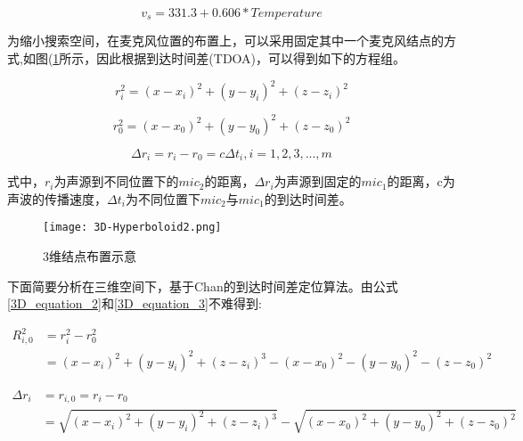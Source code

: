 \documentclass[winfonts]{njuthesis}
\begin{document}
		\begin{equation}
		   v_s = 331.3 + 0.606 * Temperature \label{v_speed}
		\end{equation}
		
		为缩小搜索空间，在麦克风位置的布置上，可以采用固定其中一个麦克风结点的方式,如图(\ref{fig: 3D-Hyperboloid2}所示，因此根据到达时间差(TDOA)，可以得到如下的方程组。
		
		\begin{equation}
			 r_i^2 = (x-x_i)^2 + (y-y_i)^2 + (z-z_i)^2 \label{3D_equation_2}
		\end{equation}
		
		\begin{equation}
			r_0^2 = (x-x_0)^2 + (y-y_0)^2 + (z-z_0)^2 \label{3D_equation_3}
		\end{equation}
		
		\begin{equation}
			\Delta r_i = r_i - r_0 = c\Delta t_i, i = 1,2,3,...,m \label{3D_equation_4}
		\end{equation}
		
		式中，$r_i$为声源到不同位置下的$mic_2$的距离，$\Delta r_i$为声源到固定的$mic_1$的距离，c为声波的传播速度，$\Delta t_i$为不同位置下$mic_2$与$mic_1$的到达时间差。
		
		\begin{figure}[H]
			\centering
			\texttt{[image: 3D-Hyperboloid2.png]} 
			\caption{3维结点布置示意}
			\label{fig: 3D-Hyperboloid2}
		\end{figure}
		
		下面简要分析在三维空间下，基于Chan的到达时间差定位算法\cite{Chan3DTDOA}。由公式\ref{3D_equation_2}和\ref{3D_equation_3}不难得到:
		
		\begin{equation}
		\begin{aligned}
			R_{i,0}^2 & = r_i^2 - r_0^2 \\
					  &	= (x-x_i)^2 + (y-y_i)^2 + (z-z_i)^3 - (x-x_0)^2 - (y-y_0)^2 - (z-z_0)^2
		\end{aligned}
		\end{equation}
		
		\begin{equation}
		\begin{aligned}
			\Delta r_i & = r_{i,0} = r_i - r_0\\	
			  		   & = \sqrt{(x-x_i)^2 + (y-y_i)^2 + (z-z_i)^3} - \sqrt{(x-x_0)^2 + (y-y_0)^2 + (z-z_0)^2}  
		\end{aligned}
		\end{equation}
		
\end{document}
